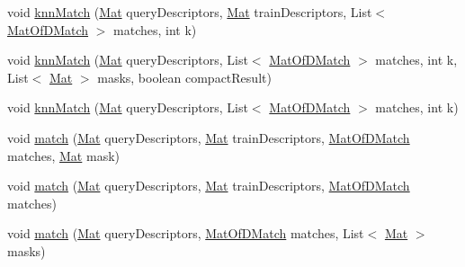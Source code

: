 \begin{DoxyCompactItemize}
\item 
void \mbox{\hyperlink{classorg_1_1opencv_1_1features2d_1_1_descriptor_matcher_a1cc8ec08cbc3bf8b61be266e82a9ea85}{knn\+Match}} (\mbox{\hyperlink{classorg_1_1opencv_1_1core_1_1_mat}{Mat}} query\+Descriptors, \mbox{\hyperlink{classorg_1_1opencv_1_1core_1_1_mat}{Mat}} train\+Descriptors, List$<$ \mbox{\hyperlink{classorg_1_1opencv_1_1core_1_1_mat_of_d_match}{Mat\+Of\+D\+Match}} $>$ matches, int k)
\item 
void \mbox{\hyperlink{classorg_1_1opencv_1_1features2d_1_1_descriptor_matcher_ac7f13b131eeee7b6a1feb67427dda08e}{knn\+Match}} (\mbox{\hyperlink{classorg_1_1opencv_1_1core_1_1_mat}{Mat}} query\+Descriptors, List$<$ \mbox{\hyperlink{classorg_1_1opencv_1_1core_1_1_mat_of_d_match}{Mat\+Of\+D\+Match}} $>$ matches, int k, List$<$ \mbox{\hyperlink{classorg_1_1opencv_1_1core_1_1_mat}{Mat}} $>$ masks, boolean compact\+Result)
\item 
void \mbox{\hyperlink{classorg_1_1opencv_1_1features2d_1_1_descriptor_matcher_a3aa08a4e72ad403da2642ee0e5e1f0a1}{knn\+Match}} (\mbox{\hyperlink{classorg_1_1opencv_1_1core_1_1_mat}{Mat}} query\+Descriptors, List$<$ \mbox{\hyperlink{classorg_1_1opencv_1_1core_1_1_mat_of_d_match}{Mat\+Of\+D\+Match}} $>$ matches, int k)
\item 
void \mbox{\hyperlink{classorg_1_1opencv_1_1features2d_1_1_descriptor_matcher_a6fb64417f5a906242f853ac835abc1aa}{match}} (\mbox{\hyperlink{classorg_1_1opencv_1_1core_1_1_mat}{Mat}} query\+Descriptors, \mbox{\hyperlink{classorg_1_1opencv_1_1core_1_1_mat}{Mat}} train\+Descriptors, \mbox{\hyperlink{classorg_1_1opencv_1_1core_1_1_mat_of_d_match}{Mat\+Of\+D\+Match}} matches, \mbox{\hyperlink{classorg_1_1opencv_1_1core_1_1_mat}{Mat}} mask)
\item 
void \mbox{\hyperlink{classorg_1_1opencv_1_1features2d_1_1_descriptor_matcher_ab247b9dc77e60a34295e01d26abd8aab}{match}} (\mbox{\hyperlink{classorg_1_1opencv_1_1core_1_1_mat}{Mat}} query\+Descriptors, \mbox{\hyperlink{classorg_1_1opencv_1_1core_1_1_mat}{Mat}} train\+Descriptors, \mbox{\hyperlink{classorg_1_1opencv_1_1core_1_1_mat_of_d_match}{Mat\+Of\+D\+Match}} matches)
\item 
void \mbox{\hyperlink{classorg_1_1opencv_1_1features2d_1_1_descriptor_matcher_a517bcdfb65926533bd6778e14a013914}{match}} (\mbox{\hyperlink{classorg_1_1opencv_1_1core_1_1_mat}{Mat}} query\+Descriptors, \mbox{\hyperlink{classorg_1_1opencv_1_1core_1_1_mat_of_d_match}{Mat\+Of\+D\+Match}} matches, List$<$ \mbox{\hyperlink{classorg_1_1opencv_1_1core_1_1_mat}{Mat}} $>$ masks)

\end{DoxyCompactItemize}
